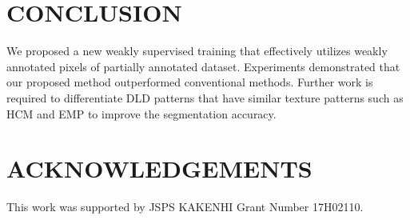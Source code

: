 \documentclass[]{spie}
\begin{document}


\section{CONCLUSION}
We proposed a new weakly supervised training  that effectively utilizes weakly annotated pixels of partially annotated dataset.
Experiments demonstrated that our proposed method outperformed conventional methods.
Further work is required to differentiate DLD patterns that have similar texture patterns such as HCM and EMP to improve the segmentation accuracy.

\section*{ACKNOWLEDGEMENTS}
This work was supported by JSPS KAKENHI Grant Number 17H02110.



\end{document}
